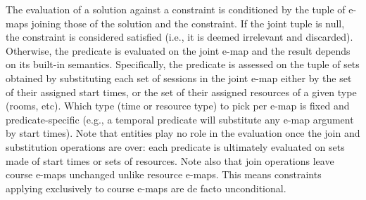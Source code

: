 The evaluation of a solution against a constraint
is conditioned by the tuple of e-maps joining those of the solution and the constraint.
If the joint tuple is null, 
the constraint is considered satisfied
(i.e., it is deemed irrelevant and discarded).
Otherwise, the predicate is evaluated on the joint e-map
and the result depends on its built-in semantics.
Specifically, the predicate is assessed on
the tuple of sets obtained by substituting each set of sessions
in the joint e-map
either by the set of their assigned start times,
or the set of their assigned resources of a given type (rooms, etc).
Which type (time or resource type) to pick per e-map is fixed and predicate-specific
(e.g., a temporal predicate will substitute any e-map argument by start times).
Note that entities play no role in the evaluation %
once the join and substitution operations are over:
each predicate is ultimately evaluated on sets made of start times or sets of resources.
Note also that join operations leave course e-maps unchanged unlike resource e-maps.
This means constraints applying exclusively to course e-maps are de facto unconditional. 


